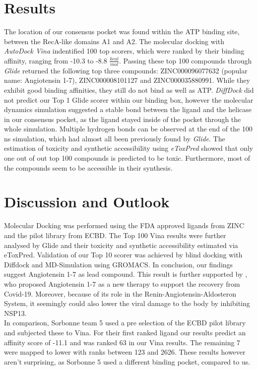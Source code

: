\documentclass[11pt, letterpaper, titlepage]{article}
\begin{document}
\section{Results}
The location of our consensus pocket was found within the ATP binding site, between the RecA-like domains A1 and A2. The molecular docking with \textit{AutoDock Vina} indentified 100 top scorers, which were ranked by their binding affinity, ranging from -10.3 to -8.8 $\frac{kcal}{mol}$. Passing these top 100 compounds through \textit{Glide} returned the following top three compounds: ZINC000096077632 (popular name: Angiotensin 1-7), ZINC000008101127 and ZINC000035880991. While they exhibit good binding affinities, they still do not bind as well as ATP. \textit{DiffDock} did not predict our Top 1 Glide scorer within our binding box, however the molecular dynamics simulation suggested a stable bond between the ligand and the helicase in our consensus pocket, as the ligand stayed inside of the pocket through the whole simulation. Multiple hydrogen bonds can be observed at the end of the 100 ns simulation, which had almost all been previously found by \textit{Glide}. The estimation of toxicity and synthetic accessibility using \textit{eToxPred} showed that only one out of out top 100 compounds is predicted to be toxic. Furthermore, most of the compounds seem to be accessible in their synthesis.

\FloatBarrier

\section{Discussion and Outlook}
Molecular Docking was performed using the FDA approved ligands from ZINC and the pilot library from ECBD. The Top 100 Vina results were further analysed by Glide and their toxicity and synthetic accessibility estimated via eToxPred. Validation of our Top 10 scorer was achieved by blind docking with Diffdock and MD-Simulation using GROMACS. In conclusion, our findings suggest Angiotensin 1-7 as lead compound. This result is further supported by \textcite{angio}, who proposed Angiotensin 1-7 as a new therapy to support the recovery from Covid-19. Moreover, because of its role in the Renin-Angiotensin-Aldosteron System, it seemingly could also lower the viral damage to the body by inhibiting NSP13.\\

In comparison, Sorbonne team 5 used a pre selection of the ECBD pilot library and subjected these to Vina. For their first ranked ligand our results predict an affinity score of -11.1 and was ranked 63 in our Vina results. The remaining 7 were mapped to lower with ranks between 123 and 2626. These results however aren't surprising, as Sorbonne 5 used a different binding pocket, compared to us.\\
\end{document}

